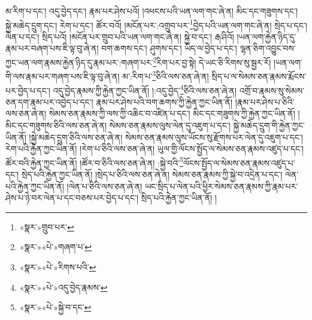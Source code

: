 མ་རིག་པ་དང་། འདུ་བྱེད་དང་། རྣམ་པར་ཤེས་པའོ། །འཕངས་པའི་ཡན་ལག་གང་ཞེ་ན། མིང་དང་གཟུགས་དང་། སྐྱེ་མཆེད་དྲུག་དང་། རེག་པ་དང་། ཚོར་བའོ། །མངོན་པར་:འགྲུབ་པར་\footnote{«སྣར་»གྲུབ་པར་}བྱེད་པའི་ཡན་ལག་གང་ཞེ་ན། སྲེད་པ་དང་། ལེན་པ་དང་། སྲིད་པའོ། །མངོན་པར་གྲུབ་པའི་ཡན་ལག་གང་ཞེ་ན། སྐྱེ་བ་དང་། རྒ་ཤིའོ། །ཡན་ལག་རྐྱེན་ཉིད་དུ་རྣམ་པར་བཞག་པས་ཇི་ལྟ་བུ་ཞེ་ན། བག་ཆགས་དང་། ཤུགས་དང་། ཡིད་ལ་བྱེད་པ་དང་། ལྷན་ཅིག་འབྱུང་བས་ཀྱང་ཡན་ལག་རྣམས་རྐྱེན་ཉིད་དུ་རྣམ་པར་:གཞག་པར་\footnote{«སྣར་»«པེ་»གཞག་པ་}རིག་པར་བྱ་སྟེ། དེ་ཡང་ཅི་རིགས་སུ་སྦྱར་རོ། །ཡན་ལག་གི་ལས་རྣམ་པར་གཞག་པས་ཇི་ལྟ་བུ་ཞེ་ན། མ་:རིག་པ་\footnote{«སྣར་»«པེ་»རིགས་པའི་}ཅིའི་ལས་ཅན་ཞེ་ན། སྲིད་པ་ལ་སེམས་ཅན་རྣམས་རྨོངས་པར་བྱེད་པ་དང་། འདུ་བྱེད་རྣམས་ཀྱི་རྐྱེན་ཀྱང་ཡིན་ནོ། །:འདུ་བྱེད་\footnote{«སྣར་»«པེ་»འདུ་བྱེད་རྣམས་}ཅིའི་ལས་ཅན་ཞེ་ན། འགྲོ་བ་རྣམས་སུ་སེམས་ཅན་དག་རྣམ་པར་འབྱེད་པ་དང་། རྣམ་པར་ཤེས་པའི་བག་ཆགས་ཀྱི་རྐྱེན་ཀྱང་ཡིན་ནོ། །རྣམ་པར་ཤེས་པ་ཅིའི་ལས་ཅན་ཞེ་ན། སེམས་ཅན་རྣམས་ཀྱི་ལས་ཀྱི་འཆིང་བ་འཛིན་པ་དང་། མིང་དང་གཟུགས་ཀྱི་རྐྱེན་ཀྱང་ཡིན་ནོ། །མིང་དང་གཟུགས་ཅིའི་ལས་ཅན་ཞེ་ན། སེམས་ཅན་རྣམས་ལུས་ལེན་དུ་འཇུག་པ་དང་། སྐྱེ་མཆེད་དྲུག་གི་རྐྱེན་ཀྱང་ཡིན་ནོ། །སྐྱེ་མཆེད་དྲུག་ཅིའི་ལས་ཅན་ཞེ་ན། སེམས་ཅན་རྣམས་ལུས་ཡོངས་སུ་རྫོགས་པར་ལེན་དུ་འཇུག་པ་དང་། རེག་པའི་རྐྱེན་ཀྱང་ཡིན་ནོ། །རེག་པ་ཅིའི་ལས་ཅན་ཞེ་ན། ཡུལ་གྱི་ལོངས་སྤྱོད་ལ་སེམས་ཅན་རྣམས་འཛུད་པ་དང་། ཚོར་བའི་རྐྱེན་ཀྱང་ཡིན་ནོ། །ཚོར་བ་ཅིའི་ལས་ཅན་ཞེ་ན། :སྐྱེ་བའི་\footnote{«སྣར་»«པེ་»སྐྱེ་བ་དང་}ལོངས་སྤྱོད་ལ་སེམས་ཅན་རྣམས་འཛུད་པ་དང་། སྲེད་པའི་རྐྱེན་ཀྱང་ཡིན་ནོ། །སྲེད་པ་ཅིའི་ལས་ཅན་ཞེ་ན། སེམས་ཅན་རྣམས་ཀྱི་སྐྱེ་བ་འདྲེན་པ་དང་། ལེན་པའི་རྐྱེན་ཀྱང་ཡིན་ནོ། །ལེན་པ་ཅིའི་ལས་ཅན་ཞེ་ན། ཡང་སྲིད་པ་ལེན་པའི་ཕྱིར་སེམས་ཅན་རྣམས་ཀྱི་རྣམ་པར་ཤེས་པ་ཉེ་བར་ལེན་པ་དང་བཅས་པར་བྱེད་པ་དང་། སྲིད་པའི་རྐྱེན་ཀྱང་ཡིན་ནོ། །
